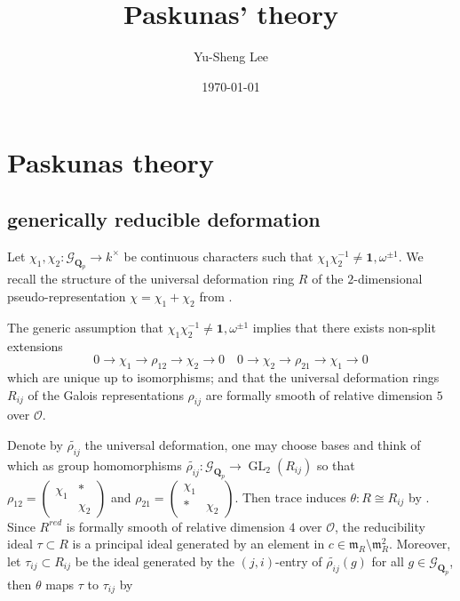 \documentclass[leqno]{amsart}
\newcommand{\smat}[1]{\left( \begin{smallmatrix} #1 \end{smallmatrix} \right)}
\newcommand{\Gp}{\mathcal{G}_{\Qp}} %
\DeclareMathOperator{\GL}{GL}
\newcommand{\Qp}{\mathbf{Q}_p}
\newcommand{\oo}{\mathcal O}
\newcommand{\id}{\mathbf{1}}
\newcommand{\1}{\mathbf{1}}
\newcommand{\fm}{\mathfrak m}
\theoremstyle{definition}
\theoremstyle{remark}
\begin{document}
\title{Paskunas' theory}
\author[Y-S.~Lee]{Yu-Sheng Lee}
\address{Department of Mathematics, University  of Michigan, Ann Arbor, MI 48109, USA}
\date{\today}

\maketitle
\setcounter{tocdepth}{1}
\tableofcontents




\section{Paskunas theory}

\subsection{generically reducible deformation}

Let $\chi_1,\chi_2\colon \Gp\to k^\times$ be continuous characters
such that $\chi_1\chi_2^{-1}\neq \id,\omega^{\pm1}$.
We recall 
the structure of the universal deformation ring $R$
of the $2$-dimensional pseudo-representation $\chi=\chi_1+\chi_2$ from \cite[\S B.1]{pask}.

The generic assumption that $\chi_1\chi_2^{-1}\neq \id,\omega^{\pm1}$
implies that there exists non-split extensions
\[
    0\to \chi_1\to \rho_{12}\to \chi_2\to 0\quad
    0\to \chi_2\to \rho_{21}\to \chi_1\to 0
\]
which are unique up to isomorphisms;
and that the universal deformation rings
$R_{ij}$ of the Galois representations $\rho_{ij}$
are formally smooth of relative dimension $5$ over $\oo$.

Denote by $\tilde{\rho_{ij}}$ the universal deformation,
one may choose bases and think of which as group homomorphisms
$\tilde{\rho_{ij}}\colon \Gp\to \GL_2(R_{ij})$
so that 
$\rho_{12}=\smat{\chi_1&*\\&\chi_2}$ and
$\rho_{21}=\smat{\chi_1&\\*&\chi_2}$.
Then trace induces $\theta\colon R\cong R_{ij}$ by \cite[Prop B.17]{pask}.
Since $R^{red}$ is formally smooth of relative dimension $4$ over  $\oo$,
the reducibility ideal  $\tau\subset R$ is a principal ideal generated by 
an element in $c\in\fm_R\setminus \fm_R^2$. 
Moreover, let $\tau_{ij}\subset R_{ij} $ be the ideal 
generated by the $(j,i)$-entry of  $ \tilde{\rho_{ij}}(g)$
for all $g\in \Gp$,
then  $\theta$ maps  $\tau$ to  $\tau_{ij}$ by \cite[Prop B.23]{pask}
\end{document}
